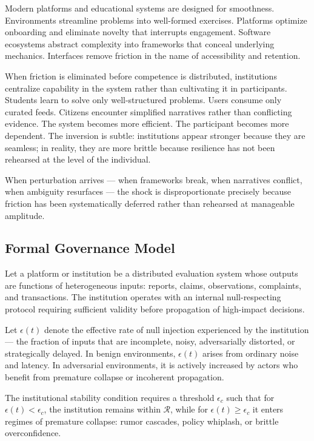 \documentclass[11pt]{article}
\theoremstyle{remark}
\begin{document}
Modern platforms and educational systems are designed for smoothness. Environments streamline problems into well-formed exercises. Platforms optimize onboarding and eliminate novelty that interrupts engagement. Software ecosystems abstract complexity into frameworks that conceal underlying mechanics. Interfaces remove friction in the name of accessibility and retention.

When friction is eliminated before competence is distributed, institutions centralize capability in the system rather than cultivating it in participants. Students learn to solve only well-structured problems. Users consume only curated feeds. Citizens encounter simplified narratives rather than conflicting evidence. The system becomes more efficient. The participant becomes more dependent. The inversion is subtle: institutions appear stronger because they are seamless; in reality, they are more brittle because resilience has not been rehearsed at the level of the individual.

When perturbation arrives — when frameworks break, when narratives conflict, when ambiguity resurfaces — the shock is disproportionate precisely because friction has been systematically deferred rather than rehearsed at manageable amplitude.

\subsection{Formal Governance Model}

Let a platform or institution be a distributed evaluation system whose outputs are functions of heterogeneous inputs: reports, claims, observations, complaints, and transactions. The institution operates with an internal null-respecting protocol requiring sufficient validity before propagation of high-impact decisions.

Let $\epsilon(t)$ denote the effective rate of null injection experienced by the institution — the fraction of inputs that are incomplete, noisy, adversarially distorted, or strategically delayed. In benign environments, $\epsilon(t)$ arises from ordinary noise and latency. In adversarial environments, it is actively increased by actors who benefit from premature collapse or incoherent propagation.

The institutional stability condition requires a threshold $\epsilon_c$ such that for $\epsilon(t) < \epsilon_c$, the institution remains within $\mathcal{R}$, while for $\epsilon(t) \geq \epsilon_c$ it enters regimes of premature collapse: rumor cascades, policy whiplash, or brittle overconfidence.
\end{document}

